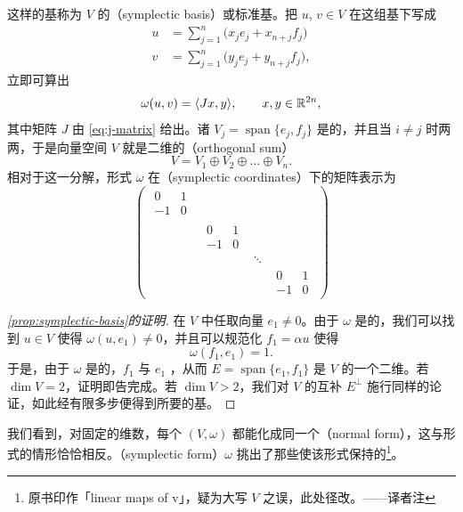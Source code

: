 这样的基称为 $V$ 的\textbf{\trSymplecticBasis}（symplectic basis）或标准基。把 $u$, $v\in V$ 在这组基下写成
\begin{align*}
u &= \sum_{j=1}^{n}\bigl(x_j e_j+x_{n+j} f_j\bigr)\\
v &= \sum_{j=1}^{n}\bigl(y_j e_j+y_{n+j} f_j\bigr),
\end{align*}
立即可算出
\[
\omega(u,v)=\langle Jx,y\rangle,\qquad x,y\in\mathbb{R}^{2n},
\]
其中矩阵 $J$ 由 \eqref{eq:j-matrix} 给出。诸\trSubspace{} $V_j=\operatorname{span}\{e_j,f_j\}$ 是\trSymplectic{}的，并且当 $i\neq j$ 时两两\trOrthogonal{}，于是向量空间 $V$ 就是二维\trSymplectic\trSubspace{}的\textbf{\trOrthogonalSum}（orthogonal sum）
\begin{equation}\label{eq:orthogonal-sum}
V=V_1\oplus V_2\oplus\dots\oplus V_n.
\end{equation}
相对于这一分解，\trBilinear{}形式 $\omega$ 在\textbf{\trSymplecticCoordinates}（symplectic coordinates）下的矩阵表示为
\[
\begin{pmatrix}
\begin{matrix}0 & 1\\ -1 & 0\end{matrix} & & & \\[10pt]
& \begin{matrix}0 & 1\\ -1 & 0\end{matrix} & & \\[10pt]
& & \ddots & \\[4pt]
& & & \begin{matrix}0 & 1\\ -1 & 0\end{matrix}
\end{pmatrix}
\]

\begin{proof}[\cref*{prop:symplectic-basis}的证明]
在 $V$ 中任取向量 $e_1\neq0$。由于 $\omega$ 是\trNondegenerate{}的，我们可以找到 $u\in V$ 使得 $\omega(u,e_1)\neq0$，并且可以规范化 $f_1=\alpha u$ 使得
\[
\omega(f_1,e_1)=1.
\]
于是，由于 $\omega$ 是\trSkewSymmetric{}的，$f_1$ 与 $e_1$ \trLinearlyIndependent，从而 $E=\operatorname{span}\{e_1,f_1\}$ 是 $V$ 的一个二维\trSymplectic\trSubspace{}。若 $\dim V=2$，证明即告完成。若 $\dim V>2$，我们对 $V$ 的互补\trSymplectic\trSubspace{} $E^{\perp}$ 施行同样的论证，如此经有限多步便得到所要的基。
\end{proof}

我们看到，对固定的维数，每个\trSymplecticVectorSpace{} $(V,\omega)$ 都能化成同一个\textbf{\trNormalForm}（normal form），这与\trNondegenerate\trSymmetric\trBilinear{}形式的情形恰恰相反。\textbf{\trSymplecticForm}（symplectic form）$\omega$ 挑出了那些使该形式保持\trInvariant{}的\trLinear\trMapping\footnote{原书印作「linear maps of v」，疑为大写 $V$ 之误，此处径改。——译者注}。

